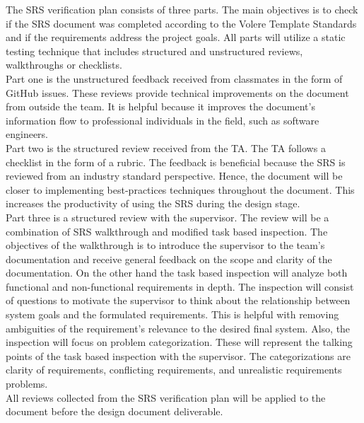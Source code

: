 \documentclass[12pt, titlepage]{article}
\begin{document}
The SRS verification plan consists of three parts. The main objectives is to check
if the SRS document was completed according to the Volere Template Standards and 
if the requirements address the project goals. All parts will utilize a static 
testing technique that includes structured and unstructured reviews, walkthroughs or checklists.\\
Part one is the unstructured feedback received from 
classmates in the form of GitHub issues. These reviews provide technical
improvements on the document from outside the team. It is helpful because it 
improves the document's information flow to professional individuals in the
field, such as software engineers.\\ 
Part two is the structured review received from the TA. The TA follows a checklist in the form of a rubric. The feedback is beneficial because the SRS is reviewed
from an industry standard perspective. Hence, the document will be
closer to implementing best-practices techniques throughout the
document. This increases the productivity of using the SRS during the
design stage.\\ 
Part three is a structured review with the supervisor. The review will be a
combination of SRS walkthrough and modified task based inspection. 
The objectives of the walkthrough is to introduce the supervisor to the 
team's documentation and receive general feedback on the scope and 
clarity of the documentation. On the other hand the task based 
inspection will analyze both functional and non-functional
requirements in depth. The inspection will consist of questions to 
motivate the supervisor to think about the relationship between 
system goals and the formulated requirements. This is helpful with 
removing ambiguities of the requirement's relevance to the desired final system. 
Also, the inspection will focus on problem categorization.
These will represent the talking points of the task based inspection with the supervisor.
The categorizations are clarity of requirements, conflicting requirements, and unrealistic requirements problems. \\
All reviews collected from the SRS verification plan will be applied
to the document before the design document deliverable.

\end{document}
